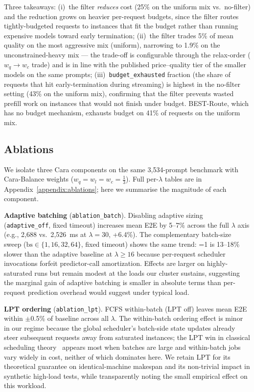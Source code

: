 \documentclass[10pt]{article}
\begin{document}
Three takeaways: (i)~the filter \emph{reduces} cost (25\% on the uniform mix vs.\ no-filter) and the reduction grows on heavier per-request budgets, since the filter routes tightly-budgeted requests to instances that fit the budget rather than running expensive models toward early termination; (ii)~the filter trades 5\% of mean quality on the most aggressive mix (uniform), narrowing to 1.9\% on the unconstrained-heavy mix — the trade-off is configurable through the relax-order ($w_q \to w_c$ trade) and is in line with the published price–quality tier of the smaller models on the same prompts; (iii)~\texttt{budget\_exhausted} fraction (the share of requests that hit early-termination during streaming) is highest in the no-filter setting (43\% on the uniform mix), confirming that the filter prevents wasted prefill work on instances that would not finish under budget. BEST-Route, which has no budget mechanism, exhausts budget on 41\% of requests on the uniform mix.

\subsection{Ablations}\label{sec:eval-ablation}

We isolate three Cara components on the same 3{,}534-prompt benchmark with Cara-Balance weights ($w_q{=}w_l{=}w_c{=}\tfrac{1}{3}$). Full per-$\lambda$ tables are in Appendix~\ref{appendix:ablations}; here we summarise the magnitude of each component.

\textbf{Adaptive batching} (\texttt{ablation\_batch}). Disabling adaptive sizing (\texttt{adaptive\_off}, fixed timeout) increases mean E2E by 5--7\% across the full $\lambda$ axis (e.g., 2{,}688 vs.\ 2{,}526~ms at $\lambda{=}30$, +6.4\%). The complementary batch-size sweep ($\text{bs} \in \{1, 16, 32, 64\}$, fixed timeout) shows the same trend: =1 is 13--18\% slower than the adaptive baseline at $\lambda \ge 16$ because per-request scheduler invocations forfeit predictor-call amortization. Effects are larger on highly-saturated runs but remain modest at the loads our cluster sustains, suggesting the marginal gain of adaptive batching is smaller in absolute terms than per-request prediction overhead would suggest under typical load.

\textbf{LPT ordering} (\texttt{ablation\_lpt}). FCFS within-batch (LPT off) leaves mean E2E within $\pm$0.5\% of baseline across all $\lambda$. The within-batch ordering effect is minor in our regime because the global scheduler's batch-side state updates already steer subsequent requests away from saturated instances; the LPT win in classical scheduling theory~\cite{graham1969bounds} appears most when batches are large and within-batch jobs vary widely in cost, neither of which dominates here. We retain LPT for its theoretical guarantee on identical-machine makespan and its non-trivial impact in synthetic high-load tests, while transparently noting the small empirical effect on this workload.
\end{document}
